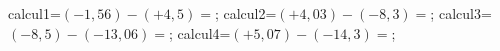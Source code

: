 \documentclass[exercice]{thedocument}%
\begin{document}
%
\>calcul1=$(-1,56)-(+4,5)=$;%
\>calcul2=$(+4,03)-(-8,3)=$;%
\>calcul3=$(-8,5)-(-13,06)=$;%
\>calcul4=$(+5,07)-(-14,3)=$;%
%
\end{document}

